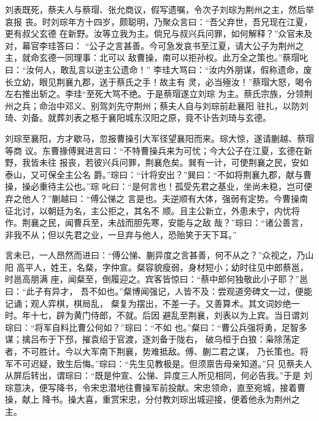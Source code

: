 刘表既死，蔡夫人与蔡瑁、张允商议，假写遗嘱，令次子刘琮为荆州之主，然后举哀报
丧。时刘琮年方十四岁，颇聪明，乃聚众言曰：“吾父弃世，吾兄现在江夏，更有叔父玄德
在新野。汝等立我为主。倘兄与叔兴兵问罪，如何解释？”众官未及对，幕官李珪答曰：
“公子之言甚善。今可急发哀书至江夏，请大公子为荆州之主，就命玄德一同理事：北可以
敌曹操，南可以拒孙权。此万全之策也。”蔡瑁叱曰：“汝何人，敢乱言以逆主公遗命！”
李珪大骂曰：“汝内外朋谋，假称遗命，废长立幼，眼见荆襄九郡，送于蔡氏之手！故主有
灵，必当殛汝！”蔡瑁大怒，喝令左右推出斩之。李珪“至死大骂不绝。于是蔡瑁遂立刘琮
为主。蔡氏宗族，分领荆州之兵；命治中邓义、别驾刘先守荆州；蔡夫人自与刘琮前赴襄阳
驻扎，以防刘琦、刘备。就葬刘表之柩于襄阳城东汉阳之原，竟不讣告刘琦与玄德。

刘琮至襄阳，方才歇马，忽报曹操引大军径望襄阳而来。琮大惊，遂请蒯越、蔡瑁等商
议。东曹掾傅巽进言曰：“不特曹操兵来为可忧；今大公子在江夏，玄德在新野，我皆未往
报丧，若彼兴兵问罪，荆襄危矣。巽有一计，可使荆襄之民，安如泰山，又可保全主公名
爵。”琮曰：“计将安出？”巽曰：“不如将荆襄九郡，献与曹操，操必重待主公也。”琮
叱曰：“是何言也！孤受先君之基业，坐尚未稳，岂可便弃之他人？”蒯越曰：“傅公悌之
言是也。夫逆顺有大体，强弱有定势。今曹操南征北讨，以朝廷为名，主公拒之，其名不
顺。且主公新立，外患未宁，内忧将作。荆襄之民，闻曹兵至，未战而胆先寒，安能与之敌
哉？”琮曰：“诸公善言，非我不从；但以先君之业，一旦弃与他人，恐贻笑于天下耳。”

言未已，一人昂然而进曰：“傅公悌、蒯异度之言甚善，何不从之？”众视之，乃山阳
高平人，姓王，名粲，字仲宣。粲容貌瘦弱，身材短小；幼时往见中郎蔡邕，时邕高朋满
座，闻粲至，倒履迎之。宾客皆惊曰：“蔡中郎何独敬此小子耶？”邕曰：“此子有异才，
吾不如也。”粲博闻强记，人皆不及：尝观道旁碑文一过，便能记诵；观人弈棋，棋局乱，
粲复为摆出，不差一子。又善算术。其文词妙绝一时。年十七，辟为黄门侍郎，不就。后因
避乱至荆襄，刘表以为上宾。当日谓刘琮曰：“将军自料比曹公何如？”琮曰：“不如
也。”粲曰：“曹公兵强将勇，足智多谋；擒吕布于下邳，摧袁绍于官渡，逐刘备于陇右，
破乌桓于白狼：枭除荡定者，不可胜计。今以大军南下荆襄，势难抵敌。傅、蒯二君之谋，
乃长策也。将军不可迟疑，致生后悔。”琮曰：“先生见教极是。但须禀告母亲知道。”只
见蔡夫人从屏后转出，谓琮曰：“既是仲宣、公悌、异度三人所见相同，何必告我。”于是
刘琮意决，便写降书，令宋忠潜地往曹操军前投献。宋忠领命，直至宛城，接着曹操，献上
降书。操大喜，重赏宋忠，分付教刘琮出城迎接，便着他永为荆州之主。

